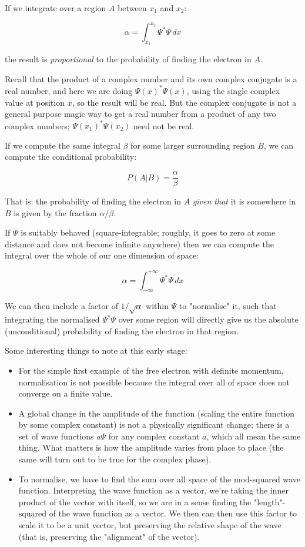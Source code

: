 If we integrate over a region $A$ between $x_1$ and $x_2$:

$$
\alpha =
\int_{x_1}^{x_2}
\Psi^*\Psi
\,dx
$$

the result is \textit{proportional} to the probability of finding the electron in $A$.

Recall that the product of a complex number and its own complex conjugate is a real number, and here we are doing $\Psi(x)^*\Psi(x)$, using the single complex value at position $x$, so the result will be real. But the complex conjugate is not a general purpose magic way to get a real number from a product of any two complex numbers; $\Psi(x_1)^*\Psi(x_2)$ need not be real.

If we compute the same integral $\beta$ for some larger surrounding region $B$, we can compute the conditional probability:

$$
P(A|B) = \frac{\alpha}{\beta}
$$

That is: the probability of finding the electron in $A$ \textit{given that} it is somewhere in $B$ is given by the fraction $\alpha / \beta$.

If $\Psi$ is suitably behaved (square-integrable; roughly, it goes to zero at some distance and does not become infinite anywhere) then we can compute the integral over the whole of our one dimension of space:

$$
\alpha =
\int_{-\infty}^{+\infty}
\Psi^*\Psi
\,dx
$$

We can then include a factor of $1/\sqrt{\alpha}$ within $\Psi$ to "normalise" it, such that integrating the normalised $\Psi^*\Psi$ over some region will directly give us the absolute (unconditional) probability of finding the electron in that region.

Some interesting things to note at this early stage:

\begin{itemize}
  \item For the simple first example of the free electron with definite momentum, normalisation is not possible because the integral over all of space does not converge on a finite value.
  \item A global change in the amplitude of the function (scaling the entire function by some complex constant) is not a physically significant change; there is a set of wave functions $a\Psi$ for any complex constant $a$, which all mean the same thing. What matters is how the amplitude varies from place to place (the same will turn out to be true for the complex phase).
  \item To normalise, we have to find the sum over all space of the mod-squared wave function. Interpreting the wave function as a vector, we're taking the inner product of the vector with itself, so we are in a sense finding the "length"-squared of the wave function as a vector. We then can then use this factor to scale it to be a unit vector, but preserving the relative shape of the wave (that is, preserving the "alignment" of the vector).
\end{itemize}

